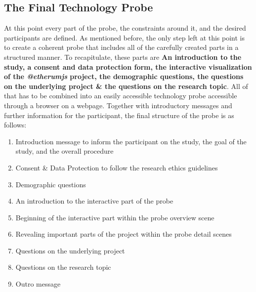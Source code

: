 \subsection{The Final Technology Probe}

At this point every part of the probe, the constraints around it, and the desired participants are defined. As mentioned before, the only step left at this point is to create a coherent probe that includes all of the carefully created parts in a structured manner. To recapitulate, these parts are \textbf{An introduction to the study, a consent and data protection form, the interactive visualization of the \textit{@etherumjs} project, the demographic questions, the questions on the underlying project \& the questions on the research topic}. All of that has to be combined into an easily accessible technology probe accessible through a browser on a webpage. Together with introductory messages and further information for the participant, the final structure of the probe is as follows:

\begin{enumerate}
  \item{Introduction message to inform the participant on the study, the goal of the study, and the overall procedure}
  \item{Consent \& Data Protection to follow the research ethics guidelines}
  \item{Demographic questions}
  \item{An introduction to the interactive part of the probe}
  \item{Beginning of the interactive part within the probe overview scene}
  \item{Revealing important parts of the project within the probe detail scenes}
  \item{Questions on the underlying project}
  \item{Questions on the research topic}
  \item{Outro message}
\end{enumerate}

